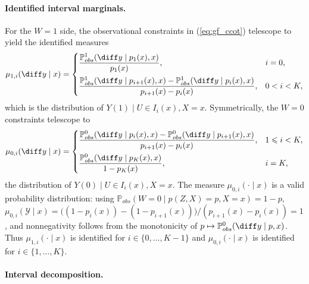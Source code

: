 \paragraph{Identified interval marginals.} For the $W = 1$ side, the observational constraints in (\ref{eq:gf_ccot}) telescope to yield the identified measures
\begin{equation}\label{eq:gf_mu1}
    \mu_{1, i}(\diff y \mid x) = \begin{cases}
        \dfrac{\mathbb{P}_{obs}^1(\diff y \mid p_1(x), x)}{p_1(x)}, & i = 0, \\[10pt]
        \dfrac{\mathbb{P}_{obs}^1(\diff y \mid p_{i+1}(x), x) - \mathbb{P}_{obs}^1(\diff y \mid p_{i}(x), x)}{p_{i+1}(x) - p_i(x)}, & 0 < i < K,
    \end{cases}
\end{equation}
which is the distribution of $Y(1) \mid U \in I_i(x), X = x$. Symmetrically, the $W = 0$ constraints telescope to
\begin{equation}\label{eq:gf_mu0}
    \mu_{0, i}(\diff y \mid x) = \begin{cases}
        \dfrac{\mathbb{P}_{obs}^0(\diff y \mid p_{i}(x), x) - \mathbb{P}_{obs}^0(\diff y \mid p_{i+1}(x), x)}{p_{i+1}(x) - p_i(x)}, & 1 \leqslant i < K, \\[10pt]
        \dfrac{\mathbb{P}_{obs}^0(\diff y \mid p_K(x), x)}{1 - p_K(x)}, & i = K,
    \end{cases}
\end{equation}
the distribution of $Y(0) \mid U \in I_i(x), X = x$. The measure $\mu_{0, i}(\cdot \mid x)$ is a valid probability distribution: using $\mathbb{P}_{obs}(W=0 \mid p(Z,X) = p, X=x) = 1 - p$, $\mu_{0,i}(\mathcal{Y} \mid x) = \bigl((1-p_i(x)) - (1-p_{i+1}(x))\bigr)/(p_{i+1}(x) - p_i(x)) = 1$, and nonnegativity follows from the monotonicity of $p \mapsto \mathbb{P}_{obs}^0(\diff y \mid p, x)$. Thus $\mu_{1, i}(\cdot \mid x)$ is identified for $i \in \{0, \dots, K-1\}$ and $\mu_{0, i}(\cdot \mid x)$ is identified for $i \in \{1, \dots, K\}$.

\paragraph{Interval decomposition.}

